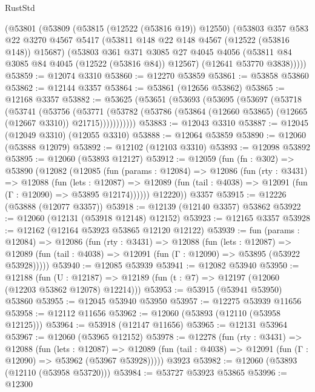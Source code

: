 \begin{lexlean}{RustStd}
\begin{coremodule}
    (@53801
      (@53809
        (@53815 (@12522 (@53816 @19)) @12550)
        (@53803
          @357
          @583
          @22
          @3270
          @4567
          @5417
          (@53811 @148 @22 @148 @4567 (@12522 (@53816 @148)) @15687)
          (@53803
            @361
            @371
            @3085
            @27
            @4045
            @4056
            (@53811 @84 @3085 @84 @4045 (@12522 (@53816 @84)) @12567)
            (@12641 @53770 @3838)))))
@53859 := @12074 @3310
@53860 := @12270 @53859
@53861 := @53858 @53860
@53862 := @12144 @3357
@53864 := @53861 (@12656 @53862)
@53865 := @12168 @3357
@53882 := @53625
    (@53651
      (@53693
        (@53695
          (@53697
            (@53718
              (@53741
                (@53756
                  (@53771
                    (@53782
                      (@53786 (@53864 (@12660 @53865) (@12665 (@12667 @3310)) @21715)))))))))))
@53883 := @12043 @3310
@53887 := @12045 (@12049 @3310) (@12055 @3310)
@53888 := @12064 @53859
@53890 := @12060 (@53888 @12079)
@53892 := @12102 (@12103 @3310)
@53893 := @12098 @53892
@53895 := @12060 (@53893 @12127)
@53912 := @12059
    (fun (fn : @302) =>
    @53890
      (@12082
        (@12085
          (fun (params : @12084) =>
          @12086
            (fun (rty : @3431) =>
            @12088
              (fun (lets : @12087) =>
              @12089 (fun (tail : @4038) => @12091 (fun (Γ : @12090) => @53895 @12174))))))
        @12220))
    @3357
@53915 := @12226 (@53888 (@12077 @3357))
@53918 := @12139 (@12140 @3357) @53862
@53922 := @12060 (@12131 (@53918 @12148) @12152)
@53923 := @12165 @3357
@53928 := @12162 (@12164 @53923 @53865 @12120 @12122)
@53939 := fun (params : @12084) =>
  @12086
    (fun (rty : @3431) =>
    @12088
      (fun (lets : @12087) =>
      @12089 (fun (tail : @4038) => @12091 (fun (Γ : @12090) => @53895 (@53922 @53928)))))
@53940 := @12085 @53939
@53941 := @12082 @53940
@53950 := @12188
    (fun (U : @12187) => @12189 (fun (t : @7) => @12197 (@12060 (@12203 @53862 @12078) @12214)))
@53953 := @53915 (@53941 @53950) @53860
@53955 := @12045 @53940 @53950
@53957 := @12275 @53939 @11656
@53958 := @12112 @11656
@53962 := @12060 (@53893 (@12110 (@53958 @12125)))
@53964 := @53918 (@12147 @11656)
@53965 := @12131 @53964
@53967 := @12060 (@53965 @12152)
@53978 := @12278
    (fun (rty : @3431) =>
    @12088
      (fun (lets : @12087) =>
      @12089 (fun (tail : @4038) => @12091 (fun (Γ : @12090) => @53962 (@53967 @53928)))))
    @3923
@53982 := @12060 (@53893 (@12110 (@53958 @53720)))
@53984 := @53727 @53923 @53865
@53996 := @12300

\end{coremodule}
\end{lexlean}
